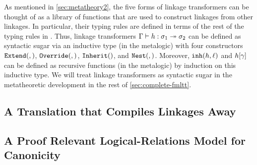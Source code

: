 As mentioned in \cref{sec:metatheory2}, the five forms of linkage transformers can be
thought of as a library of functions that are used to construct linkages from other
linkages.
In particular, their typing rules are defined in terms of the rest of the typing
rules in \TT.
Thus, linkage transformers $ {\Gamma} \vdash {h} : {\sigma_1} \twoheadrightarrow {\ensuremath{\sigma}_2}$ can be defined
as syntactic sugar via an inductive type (in the meta\-logic) with four constructors
$\texttt{Extend}({},{})$, $\texttt{Override}({},{})$, $\texttt{Inherit}({})$, and $\texttt{Nest}({},{})$.
Moreover, $\texttt{inh}({h},{\ell})$ and ${h}\!\left[{\gamma}\right]$ can be defined
as recursive functions (in the meta\-logic) by induction on this inductive type.
We will treat linkage transformers as syntactic sugar in the meta\-theoretic development
in the rest of \cref{sec:complete-fmltt}.

\subsection{A Translation that Compiles Linkages Away}





% 


\subsection{A Proof Relevant Logical-Relations Model for Canonicity}
\label{sec:canonicity-model}


